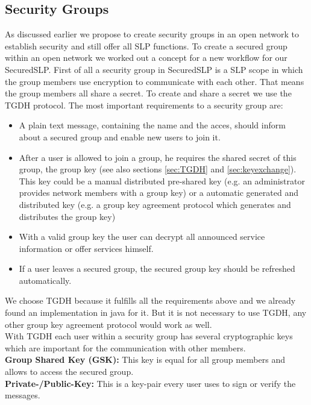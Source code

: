 \subsection{Security Groups}
As discussed earlier we propose to create security groups in an open network to establish security and still offer all SLP functions. To create a secured group within an open network we worked out a concept for a new workflow for our SecuredSLP. First of all a security group in SecuredSLP is a SLP scope in which the group members use encryption to communicate with each other. That means the group members all share a secret. To create and share a secret we use the TGDH protocol. The most important requirements to a security group are:
\begin{itemize}
  \item A plain text message, containing the name and the acces, should inform about a secured group and enable new users to join it.
  \item After a user is allowed to join a group, he requires the shared secret of this group, the group key (see also sections \ref{sec:TGDH} and \ref{sec:keyexchange}). This key could be a manual distributed pre-shared key (e.g. an administrator provides network members with a group key) or a automatic generated and distributed key (e.g. a group key agreement protocol which generates and distributes the group key)
  \item With a valid group key the user can decrypt all announced service information or offer services himself.
  \item If a user leaves a secured group, the secured group key should be refreshed automatically.
\end{itemize}
We choose TGDH because it fulfills all the requirements above and we already found an implementation in java for it. But it is not necessary to use TGDH, any other group key agreement protocol would work as well.\\
With TGDH each user within a security group has several cryptographic keys which are important for the communication with other members.\\
\textbf{Group Shared Key (GSK):} This key is equal for all group members and allows to access the secured group.\\
\textbf{Private-/Public-Key:} This is a key-pair every user uses to sign or verify the messages.

